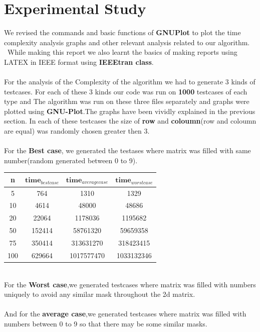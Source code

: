 \documentclass[conference]{IEEEtran}
\begin{document}
\section{\textbf{Experimental Study}}
We revised the commands and basic functions of \textbf{GNUPlot}
to plot the time complexity analysis graphs and other relevant
analysis related to our algorithm.
\\
\	While making this report we also learnt the basics of
making reports using LATEX in IEEE format using \textbf{IEEEtran
class}.
\\\\
For the analysis of the Complexity of the algorithm we had to generate 3 kinds of testcases. For each of these 3 kinds our code was run on \textbf{1000} testcases of each type and The algorithm was run on these three files separately and graphs were plotted using \textbf{GNU-Plot}.The graphs have been vividly explained in the previous section. In each of these testcases the size of \textbf{row} and \textbf{coloumn}(row and coloumn are equal) was randomly chosen greater then 3.
\\
\\
For the \textbf{Best case}, we generated the testases where matrix was filled with same number(random generated between 0 to 9).
\\
\begin{table}[h!]
\begin{center}
    \label{tab:table1}
    \begin{tabular}{|c|c|c|c|} %
    \hline
      \textbf{n} & $\textbf{{time}}_{{best case}}$ & $\textbf{{time}}_{{average case}}$ & $\textbf{{time}}_{{worst case}}$
      \\
      \hline
      5 & 764 & 1310 & 1329\\
      \hline
      10 & 4614 & 48000 & 48686\\
      \hline
      20 & 22064 & 1178036 & 1195682\\
      \hline
      50 & 152414 & 58761320 & 59659358\\
      \hline
	  75 & 350414 & 313631270 & 318423415\\
      \hline
	  100 & 629664 & 1017577470 & 1033132346\\
      \hline
    \end{tabular}
\end{center}
\end{table}
\\
For the \textbf{Worst case},we generated testcases where matrix was filled with numbers uniquely to avoid any similar mask throughout the 2d matrix.\\
\\
 And for the \textbf{average case},we generated testcases where matrix was filled with numbers between 0 to 9 so that there may be some similar masks.
 \\
\end{document}
